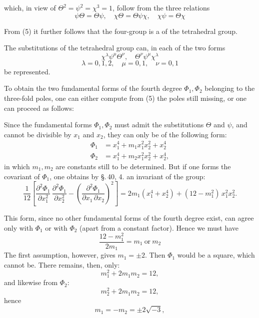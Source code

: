which, in view of $\Theta^2 = \psi^2 = \chi^3 = 1$, follow from the three
relations
\[
\psi\Theta = \Theta\psi, \quad \chi\Theta = \Theta\psi\chi, \quad \chi\psi = \Theta\chi
\]

From (5) it further follows that the four-group
is a  of the tetrahedral group.

The substitutions of the tetrahedral group can, in each of the
two forms
\[
\chi^\lambda \psi^\mu \Theta^\nu, \quad \Theta^\nu \psi^\mu \chi^\lambda
\]
\[
\lambda = 0, 1, 2, \quad \mu = 0, 1, \quad \nu = 0, 1
\]
be represented.

To obtain the two fundamental forms of the fourth degree $\Phi_1, \Phi_2$
belonging to the three-fold poles, one can either compute
from (5) the poles still missing, or one can proceed as
follows:

Since the fundamental forms $\Phi_1, \Phi_2$ must admit the substitutions $\Theta$ and $\psi$,
and cannot be divisible by $x_1$ and $x_2$,
they can only be of the following form:
\[
\begin{aligned}
\Phi_1 &= x_1^4 + m_1 x_1^2 x_2^2 + x_2^4 \\
\Phi_2 &= x_1^4 + m_2 x_1^2 x_2^2 + x_2^4,
\end{aligned}
\]
in which $m_1, m_2$ are constants still to be determined. But if one forms
the  covariant of $\Phi_1$, one obtains by
\S.\,40, 4. an invariant of the group:
\[
\frac{1}{12}\left[\frac{\partial^2 \Phi_1}{\partial x_1^2}\,\frac{\partial^2 \Phi_1}{\partial x_2^2} - \left(\frac{\partial^2 \Phi_1}{\partial x_1\,\partial x_2}\right)^2\right] = 2m_1(x_1^4+x_2^4) + (12-m_1^2)\,x_1^2 x_2^2.
\]

This form, since no other fundamental forms of the fourth
degree exist, can agree only with $\Phi_1$ or with $\Phi_2$
(apart from a constant factor). Hence we must have
\[
\frac{12-m_1^2}{2m_1} = m_1 \ \text{or}\ m_2
\]
The first assumption, however, gives $m_1 = \pm 2$. Then $\Phi_1$
would be a square, which cannot be. There remains, then, only:
\[
m_1^2 + 2m_1 m_2 = 12,
\]
and likewise from $\Phi_2$:
\[
m_2^2 + 2m_1 m_2 = 12,
\]
hence
\[
m_1 = -m_2 = \pm 2\sqrt{-3},
\]
